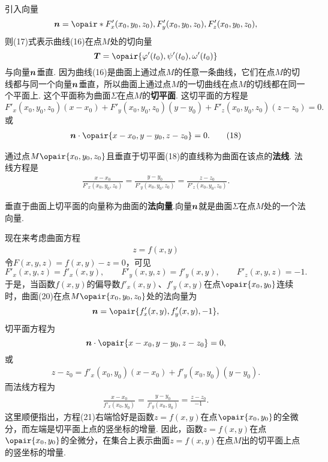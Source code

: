 引入向量\begin{equation}
\mat{n}=\opair*{F'_x(x_0,y_0,z_0),F'_y(x_0,y_0,z_0),F'_z(x_0,y_0,z_0)},
\end{equation}则(17)式表示曲线(16)在点\(M\)处的切向量\[
\mat{T} = \opair{\varphi'(t_0),\psi'(t_0),\omega'(t_0)}
\]与向量\(\boldsymbol{n}\)垂直.
因为曲线(16)是曲面上通过点\(M\)的任意一条曲线，它们在点\(M\)的切线都与同一个向量\(\boldsymbol{n}\)垂直，所以曲面上通过点\(M\)的一切曲线在点\(M\)的切线都在同一个平面上.
这个平面称为曲面\(\Sigma\)在点\(M\)的\textbf{切平面}.
这切平面的方程是\[
F'_x(x_0,y_0,z_0) (x-x_0)
+ F'_y(x_0,y_0,z_0) (y-y_0)
+ F'_z(x_0,y_0,z_0) (z-z_0)
= 0.
\]或\begin{gather}
\mat{n}\cdot\opair{x-x_0,y-y_0,z-z_0}=0.
\tag{18}
\end{gather}

通过点\(M\opair{x_0,y_0,z_0}\)且垂直于切平面(18)的直线称为曲面在该点的\textbf{法线}.
法线方程是\begin{gather}
\frac{x-x_0}{F'_x(x_0,y_0,z_0)}
=\frac{y-y_0}{F'_y(x_0,y_0,z_0)}
=\frac{z-z_0}{F'_z(x_0,y_0,z_0)}.
\tag{19}
\end{gather}

垂直于曲面上切平面的向量称为曲面的\textbf{法向量}.向量\(\boldsymbol{n}\)就是曲面\(\Sigma\)在点\(M\)处的一个法向量.


现在来考虑曲面方程\begin{gather}
z = f(x,y)
\tag{20}
\end{gather}
令\(F(x,y,z)=f(x,y)-z=0\)，可见\[
F'_x(x,y,z) = f'_x(x,y),
\qquad
F'_y(x,y,z) = f'_y(x,y),
\qquad
F'_z(x,y,z) = -1.
\]于是，当函数\(f(x,y)\)的偏导数\(f'_x(x,y)\)、\(f'_y(x,y)\)在点\(\opair{x_0,y_0}\)连续时，曲面(20)在点\(M\opair{x_0,y_0,z_0}\)处的法向量为\[
\mat{n}=\opair{f'_x(x,y),f'_y(x,y),-1},
\]切平面方程为\[
\mat{n}\cdot\opair{x-x_0,y-y_0,z-z_0}=0,
\]或\begin{gather}
z-z_0 = f'_x(x_0,y_0) (x-x_0) + f'_y(x_0,y_0) (y-y_0).
\tag{21}
\end{gather}而法线方程为\begin{gather}
\frac{x-x_0}{f'_x(x_0,y_0)}
=\frac{y-y_0}{f'_y(x_0,y_0)}
=\frac{z-z_0}{-1}.
\tag{22}
\end{gather}
这里顺便指出，方程(21)右端恰好是函数\(z = f(x,y)\)在点\(\opair{x_0,y_0}\)的全微分，而左端是切平面上点的竖坐标的增量.
因此，函数\(z = f(x,y)\)在点\(\opair{x_0,y_0}\)的全微分，在集合上表示曲面\(z = f(x,y)\)在点\(M\)出的切平面上点的竖坐标的增量.

